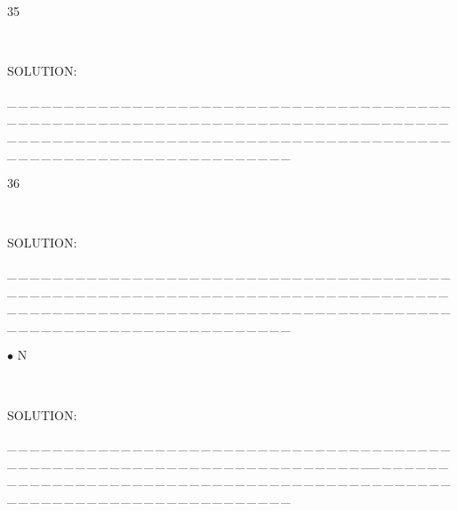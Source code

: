 \documentclass[a4paper, 11pt, UTF8]{article}
\begin{document}
\begin{large}
{\timesbf\Large 35} {\timessl\Large 
}\par\quad\,
{\timessl\Large
}\par
{\timesbf S\footnotesize{OLUTION:}}\par\quad

\par
{\tiny \_\,\_\,\_\,\_\,\_\,\_\,\_\,\_\,\_\,\_\,\_\,\_\,\_\,\_\,\_\,\_\,\_\,\_\,\_\,\_\,\_\,\_\,\_\,\_\,\_\,\_\,\_\,\_\,\_\,\_\,\_\,\_\,\_\,\_\,\_\,\_\,\_\,\_\,\_\,\_\,\_\,\_\,\_\,\_\,\_\,\_\,\_\,\_\,\_\,\_\,\_\,\_\,\_\,\_\,\_\,\_\,\_\,\_\,\_\,\_\,\_\,\_\,\_\,\_\,\_\,\_\,\_\,\_\,\_\,\_\,\_\_\,\_\,\_\,\_\,\_\,\_\,\_\,\_\,\_\,\_\,\_\,\_\,\_\,\_\,\_\,\_\,\_\,\_\,\_\,\_\,\_\,\_\,\_\,\_\,\_\,\_\,\_\,\_\,\_\,\_\,\_\,\_\,\_\,\_\,\_\,\_\,\_\,\_\,\_\,\_\,\_\,\_\,\_\,\_\,\_\,\_\,\_\,\_\,\_\,\_\,\_\,\_\,\_\,\_\,\_\,\_\,\_\,\_\,\_\,\_\,\_\,\_\,\_\,\_\,\_\,\_\,\_\,\_\,\_\,\_\,\_}\par

{\timesbf\Large 36} {\timessl\Large 
}\par\quad\,
{\timessl\Large
}\par
{\timesbf S\footnotesize{OLUTION:}}\par\quad

\par
{\tiny \_\,\_\,\_\,\_\,\_\,\_\,\_\,\_\,\_\,\_\,\_\,\_\,\_\,\_\,\_\,\_\,\_\,\_\,\_\,\_\,\_\,\_\,\_\,\_\,\_\,\_\,\_\,\_\,\_\,\_\,\_\,\_\,\_\,\_\,\_\,\_\,\_\,\_\,\_\,\_\,\_\,\_\,\_\,\_\,\_\,\_\,\_\,\_\,\_\,\_\,\_\,\_\,\_\,\_\,\_\,\_\,\_\,\_\,\_\,\_\,\_\,\_\,\_\,\_\,\_\,\_\,\_\,\_\,\_\,\_\,\_\_\,\_\,\_\,\_\,\_\,\_\,\_\,\_\,\_\,\_\,\_\,\_\,\_\,\_\,\_\,\_\,\_\,\_\,\_\,\_\,\_\,\_\,\_\,\_\,\_\,\_\,\_\,\_\,\_\,\_\,\_\,\_\,\_\,\_\,\_\,\_\,\_\,\_\,\_\,\_\,\_\,\_\,\_\,\_\,\_\,\_\,\_\,\_\,\_\,\_\,\_\,\_\,\_\,\_\,\_\,\_\,\_\,\_\,\_\,\_\,\_\,\_\,\_\,\_\,\_\,\_\,\_\,\_\,\_\,\_\,\_}\par

{\small $\bullet$}
{\timesbf\Large N} {\timessl\Large 
}\par\quad\,
{\timessl\Large
}\par
{\timesbf S\footnotesize{OLUTION:}}\par\quad

\par
{\tiny \_\,\_\,\_\,\_\,\_\,\_\,\_\,\_\,\_\,\_\,\_\,\_\,\_\,\_\,\_\,\_\,\_\,\_\,\_\,\_\,\_\,\_\,\_\,\_\,\_\,\_\,\_\,\_\,\_\,\_\,\_\,\_\,\_\,\_\,\_\,\_\,\_\,\_\,\_\,\_\,\_\,\_\,\_\,\_\,\_\,\_\,\_\,\_\,\_\,\_\,\_\,\_\,\_\,\_\,\_\,\_\,\_\,\_\,\_\,\_\,\_\,\_\,\_\,\_\,\_\,\_\,\_\,\_\,\_\,\_\,\_\_\,\_\,\_\,\_\,\_\,\_\,\_\,\_\,\_\,\_\,\_\,\_\,\_\,\_\,\_\,\_\,\_\,\_\,\_\,\_\,\_\,\_\,\_\,\_\,\_\,\_\,\_\,\_\,\_\,\_\,\_\,\_\,\_\,\_\,\_\,\_\,\_\,\_\,\_\,\_\,\_\,\_\,\_\,\_\,\_\,\_\,\_\,\_\,\_\,\_\,\_\,\_\,\_\,\_\,\_\,\_\,\_\,\_\,\_\,\_\,\_\,\_\,\_\,\_\,\_\,\_\,\_\,\_\,\_\,\_\,\_}\par


\end{large}
\end{document}
